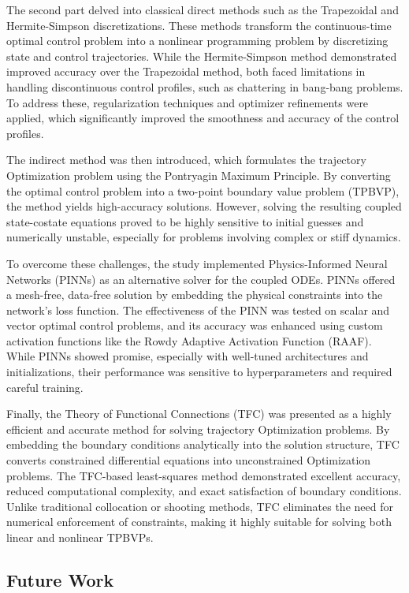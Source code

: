 \documentclass[
  number,
  preprint]{elsarticle}
\begin{document}
The second part delved into classical direct methods such as the
Trapezoidal and Hermite-Simpson discretizations. These methods transform
the continuous-time optimal control problem into a nonlinear programming
problem by discretizing state and control trajectories. While the
Hermite-Simpson method demonstrated improved accuracy over the
Trapezoidal method, both faced limitations in handling discontinuous
control profiles, such as chattering in bang-bang problems. To address
these, regularization techniques and optimizer refinements were applied,
which significantly improved the smoothness and accuracy of the control
profiles.

The indirect method was then introduced, which formulates the trajectory
Optimization problem using the Pontryagin Maximum Principle. By
converting the optimal control problem into a two-point boundary value
problem (TPBVP), the method yields high-accuracy solutions. However,
solving the resulting coupled state-costate equations proved to be
highly sensitive to initial guesses and numerically unstable, especially
for problems involving complex or stiff dynamics.

To overcome these challenges, the study implemented Physics-Informed
Neural Networks (PINNs) as an alternative solver for the coupled ODEs.
PINNs offered a mesh-free, data-free solution by embedding the physical
constraints into the network's loss function. The effectiveness of the
PINN was tested on scalar and vector optimal control problems, and its
accuracy was enhanced using custom activation functions like the Rowdy
Adaptive Activation Function (RAAF). While PINNs showed promise,
especially with well-tuned architectures and initializations, their
performance was sensitive to hyperparameters and required careful
training.

Finally, the Theory of Functional Connections (TFC) was presented as a
highly efficient and accurate method for solving trajectory Optimization
problems. By embedding the boundary conditions analytically into the
solution structure, TFC converts constrained differential equations into
unconstrained Optimization problems. The TFC-based least-squares method
demonstrated excellent accuracy, reduced computational complexity, and
exact satisfaction of boundary conditions. Unlike traditional
collocation or shooting methods, TFC eliminates the need for numerical
enforcement of constraints, making it highly suitable for solving both
linear and nonlinear TPBVPs.

\subsection*{Future Work}\label{future-work}
\end{document}
